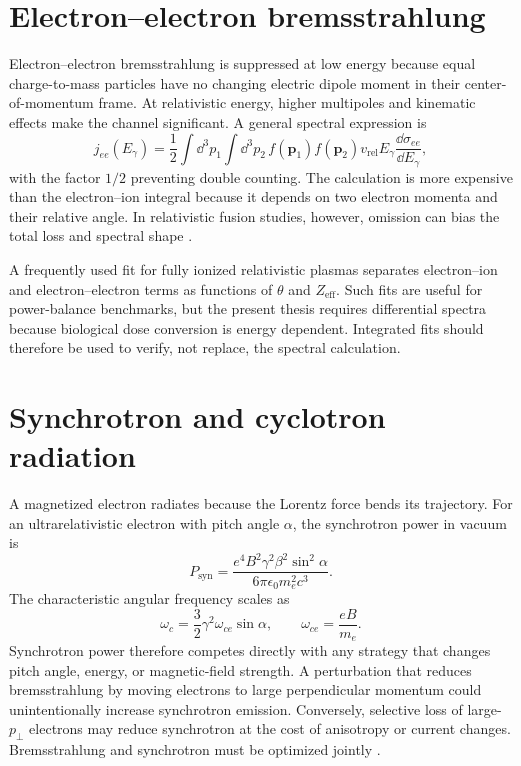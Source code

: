 \section{Electron--electron bremsstrahlung}

Electron--electron bremsstrahlung is suppressed at low energy because equal charge-to-mass particles have no changing electric dipole moment in their center-of-momentum frame. At relativistic energy, higher multipoles and kinematic effects make the channel significant. A general spectral expression is
\begin{equation}
 j_{ee}(E_\gamma)
 =\frac{1}{2}\int\!\dd^3p_1\int\!\dd^3p_2\,
 f(\mathbf{p}_1)f(\mathbf{p}_2)
 v_{\mathrm{rel}}E_\gamma
 \frac{\dd\sigma_{ee}}{\dd E_\gamma},
\label{eq:ee-emissivity}
\end{equation}
with the factor $1/2$ preventing double counting. The calculation is more expensive than the electron--ion integral because it depends on two electron momenta and their relative angle. In relativistic fusion studies, however, omission can bias the total loss and spectral shape \cite{haug1975,svennson1982,munirov2023}.

A frequently used fit for fully ionized relativistic plasmas separates electron--ion and electron--electron terms as functions of $\theta$ and $Z_{\mathrm{eff}}$. Such fits are useful for power-balance benchmarks, but the present thesis requires differential spectra because biological dose conversion is energy dependent. Integrated fits should therefore be used to verify, not replace, the spectral calculation.

\section{Synchrotron and cyclotron radiation}

A magnetized electron radiates because the Lorentz force bends its trajectory. For an ultrarelativistic electron with pitch angle $\alpha$, the synchrotron power in vacuum is
\begin{equation}
P_{\mathrm{syn}}
=\frac{e^4B^2\gamma^2\beta^2\sin^2\alpha}
{6\pi\epsilon_0m_e^2c^3}.
\label{eq:synch-power}
\end{equation}
The characteristic angular frequency scales as
\begin{equation}
\omega_c=\frac{3}{2}\gamma^2\omega_{ce}\sin\alpha,
\qquad \omega_{ce}=\frac{eB}{m_e}.
\label{eq:synch-freq}
\end{equation}
Synchrotron power therefore competes directly with any strategy that changes pitch angle, energy, or magnetic-field strength. A perturbation that reduces bremsstrahlung by moving electrons to large perpendicular momentum could unintentionally increase synchrotron emission. Conversely, selective loss of large-$p_\perp$ electrons may reduce synchrotron at the cost of anisotropy or current changes. Bremsstrahlung and synchrotron must be optimized jointly \cite{blumenthal1970,embreus2016}.

